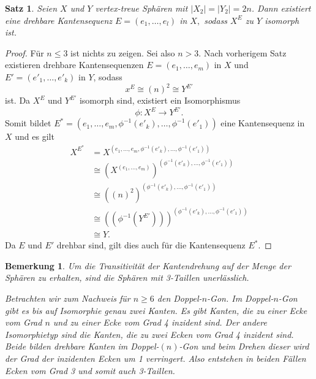 \documentclass[12pt,titlepage,twoside,cleardoublepage]{article}
\theoremstyle{nummermitklammern}
\newtheorem{bemerkung}[temp]{Bemerkung}
\newtheorem{satz}[temp]{Satz}
\newtheorem{bemerkung}[zahl]{Bemerkung}
\newtheorem{satz}[zahl]{Satz}
\numberwithin{equation}{section}
\begin{document}
\begin{satz} \label{kantendrehung}
Seien $X$ und $Y$ vertex-treue Sphären mit $\vert X_2\vert=\vert Y_2\vert=2n$.
Dann existiert eine drehbare Kantensequenz $E=(e_1,\ldots,e_l)$ in $X,$ sodass  $X^E$ zu $Y$ isomorph ist. 
\end{satz}
\begin{proof}
Für $n\leq 3$ ist nichts zu zeigen. Sei also $n>3$. Nach vorherigem Satz existieren drehbare Kantensequenzen $E=(e_1,\ldots,e_m)$ in $X$ und $E'=(e'_1,\ldots,e'_{k})$ in $Y$, sodass 
\[
x^E\cong (n)^2 \cong Y^{E'}
\] ist.
Da $X^E$ und $Y^{E'}$ isomorph sind, existiert ein Isomorphismus 
\[
\phi: X^E\to Y^{E'}.
\]
Somit bildet $E^*=(e_1,\ldots,e_m,\phi^{-1}(e'_{k}),\ldots,\phi^{-1}(e'_{1}))$ eine Kantensequenz in $X$ und es gilt
\begin{align*}
X^{E^{*}}& = X^{(e_1,\ldots,e_m,\phi^{-1}(e'_{k}),\ldots,\phi^{-1}(e'_{1}))}\\
&\cong (X^{(e_1,\ldots,e_m)})^{(\phi^{-1}(e'_{k}),\ldots,\phi^{-1}(e'_{1}))}\\
&\cong ((n)^2)^{(\phi^{-1}(e'_{k}),\ldots,\phi^{-1}(e'_{1}))}\\
&\cong ((\phi^{-1}(Y^{E'})))^{(\phi^{-1}(e'_{k}),\ldots,\phi^{-1}(e'_{1}))}\\
&\cong Y .
\end{align*}
Da $E$ und $E'$ drehbar sind, gilt dies auch für die Kantensequenz $E^*.$
\end{proof}
\begin{bemerkung}
 Um die Transitivität der Kantendrehung auf der Menge der Sphären zu erhalten, sind die Sphären mit 3-Taillen unerlässlich.

 Betrachten wir zum Nachweis für $n\geq 6$ den Doppel-$n$-Gon. Im Doppel-$n$-Gon gibt es bis auf Isomorphie genau zwei Kanten. Es gibt Kanten, die zu einer Ecke vom Grad $n$ und zu einer Ecke vom Grad 4 inzident sind. Der andere Isomorphietyp sind die Kanten, die zu zwei Ecken vom Grad 4 inzident sind. Beide bilden drehbare Kanten im Doppel-$(n)$-Gon und beim Drehen dieser wird der Grad der inzidenten Ecken um 1 verringert. Also entstehen in beiden Fällen Ecken vom Grad 3 und somit auch 3-Taillen.
\end{bemerkung}
\end{document}
